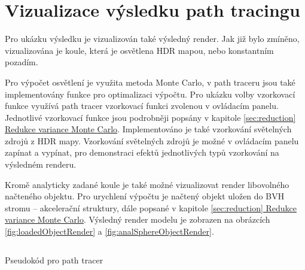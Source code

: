 \documentclass[czech,master]{diploma}
\begin{document}
\section{Vizualizace výsledku path tracingu}
Pro ukázku výsledku je vizualizován také výsledný render. Jak již bylo zmíněno, vizualizována je koule, která je osvětlena HDR mapou, nebo konstantním pozadím.\par
Pro výpočet osvětlení je využita metoda Monte Carlo, v path traceru jsou také implementovány funkce pro optimalizaci výpočtu. Pro ukázku volby vzorkovací funkce využívá path tracer vzorkovací funkci zvolenou v ovládacím panelu. Jednotlivé vzorkovací funkce jsou podrobněji popsány v kapitole \hyperref[sec:reduction]{\ref{sec:reduction} Redukce variance Monte Carlo}. Implementováno je také vzorkování světelných zdrojů z HDR mapy. Vzorkování světelných zdrojů je možné v ovládacím panelu zapínat a vypínat, pro demonstraci efektů jednotlivých typů vzorkování na výsledném renderu.\par
Kromě analyticky zadané koule je také možné vizualizovat render libovolného načteného objektu. Pro urychlení výpočtu je načtený objekt uložen do BVH stromu -- akcelerační struktury, dále popsané v kapitole \hyperref[sec:reduction]{\ref{sec:reduction} Redukce variance Monte Carlo}. Výsledný render modelu je zobrazen na obrázcích \hyperref[fig:loadedObjectRender]{\ref{fig:loadedObjectRender}} a \hyperref[fig:analSphereObjectRender]{\ref{fig:analSphereObjectRender}}.

\begin{listing}[ht]
  \inputminted{python}{pathTracer.py}
  \caption{Pseudokód pro path tracer}
  \label{src:pathtracer}
\end{listing}
\end{document}

